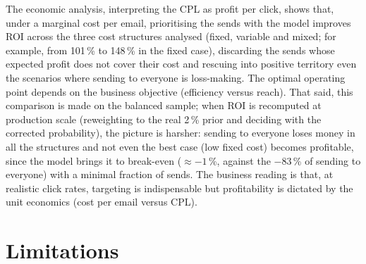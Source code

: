 The economic analysis, interpreting the CPL as profit per click, shows that, under a marginal cost per email, prioritising the sends with the model improves ROI across the three cost structures analysed (fixed, variable and mixed; for example, from 101\,\% to 148\,\% in the fixed case), discarding the sends whose expected profit does not cover their cost and rescuing into positive territory even the scenarios where sending to everyone is loss-making. The optimal operating point depends on the business objective (efficiency versus reach). That said, this comparison is made on the balanced sample; when ROI is recomputed at production scale (reweighting to the real 2\,\% prior and deciding with the corrected probability), the picture is harsher: sending to everyone loses money in all the structures and not even the best case (low fixed cost) becomes profitable, since the model brings it to break-even ($\approx-1$\,\%, against the $-$83\,\% of sending to everyone) with a minimal fraction of sends. The business reading is that, at realistic click rates, targeting is indispensable but profitability is dictated by the unit economics (cost per email versus CPL).

\section{Limitations}

